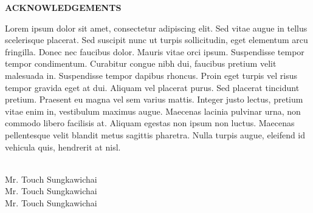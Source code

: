 \begin{center}
    \fontheading
    \textbf{ACKNOWLEDGEMENTS} \\
\end{center}

\fontbody
Lorem ipsum dolor sit amet, consectetur adipiscing elit. Sed vitae augue in tellus scelerisque placerat. Sed suscipit nunc ut turpis sollicitudin, eget elementum arcu fringilla. Donec nec faucibus dolor. Mauris vitae orci ipsum. Suspendisse tempor tempor condimentum. Curabitur congue nibh dui, faucibus pretium velit malesuada in. Suspendisse tempor dapibus rhoncus. Proin eget turpis vel risus tempor gravida eget at dui. Aliquam vel placerat purus. Sed placerat tincidunt pretium. Praesent eu magna vel sem varius mattis. Integer justo lectus, pretium vitae enim in, vestibulum maximus augue. Maecenas lacinia pulvinar urna, non commodo libero facilisis at. Aliquam egestas non ipsum non luctus. Maecenas pellentesque velit blandit metus sagittis pharetra. Nulla turpis augue, eleifend id vehicula quis, hendrerit at nisl. \\\\

\begin{flushright}
    Mr. Touch Sungkawichai \\
    Mr. Touch Sungkawichai \\
    Mr. Touch Sungkawichai \\
\end{flushright}
